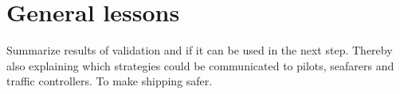 \chapter{General lessons}
Summarize results of validation and if it can be used in the next step. Thereby also explaining which strategies could be communicated to pilots, seafarers and traffic controllers. To make shipping safer.